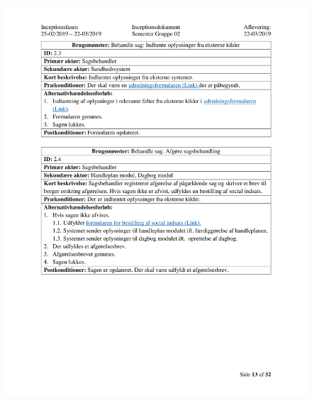 \begin{figure}[hb]
  \includegraphics[scale = 0.33]{./PNG/Inceptions/Gruppe 02 + InceptionsDokument-14.jpg} 
\end{figure}

